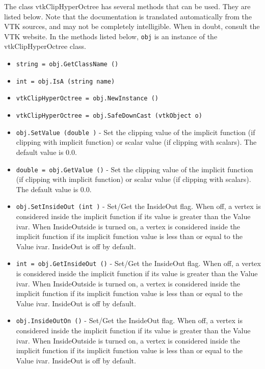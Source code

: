 The class vtkClipHyperOctree has several methods that can be used.
  They are listed below.
Note that the documentation is translated automatically from the VTK sources,
and may not be completely intelligible.  When in doubt, consult the VTK website.
In the methods listed below, \verb|obj| is an instance of the vtkClipHyperOctree class.
\begin{itemize}
\item  \verb|string = obj.GetClassName ()|

\item  \verb|int = obj.IsA (string name)|

\item  \verb|vtkClipHyperOctree = obj.NewInstance ()|

\item  \verb|vtkClipHyperOctree = obj.SafeDownCast (vtkObject o)|

\item  \verb|obj.SetValue (double )| -  Set the clipping value of the implicit function (if clipping with
 implicit function) or scalar value (if clipping with
 scalars). The default value is 0.0. 

\item  \verb|double = obj.GetValue ()| -  Set the clipping value of the implicit function (if clipping with
 implicit function) or scalar value (if clipping with
 scalars). The default value is 0.0. 

\item  \verb|obj.SetInsideOut (int )| -  Set/Get the InsideOut flag. When off, a vertex is considered
 inside the implicit function if its value is greater than the
 Value ivar. When InsideOutside is turned on, a vertex is
 considered inside the implicit function if its implicit function
 value is less than or equal to the Value ivar.  InsideOut is off
 by default.

\item  \verb|int = obj.GetInsideOut ()| -  Set/Get the InsideOut flag. When off, a vertex is considered
 inside the implicit function if its value is greater than the
 Value ivar. When InsideOutside is turned on, a vertex is
 considered inside the implicit function if its implicit function
 value is less than or equal to the Value ivar.  InsideOut is off
 by default.

\item  \verb|obj.InsideOutOn ()| -  Set/Get the InsideOut flag. When off, a vertex is considered
 inside the implicit function if its value is greater than the
 Value ivar. When InsideOutside is turned on, a vertex is
 considered inside the implicit function if its implicit function
 value is less than or equal to the Value ivar.  InsideOut is off
 by default.


\end{itemize}

